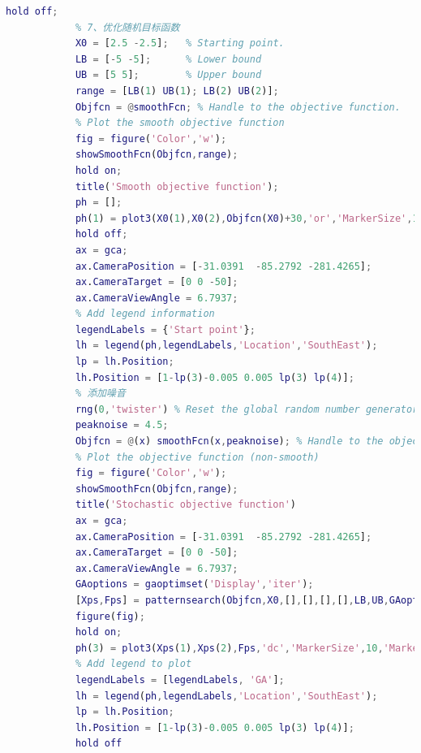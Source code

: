 \begin{lstlisting}[language = Matlab]
            hold off;
            % 7、优化随机目标函数
            X0 = [2.5 -2.5];   % Starting point.
            LB = [-5 -5];      % Lower bound
            UB = [5 5];        % Upper bound
            range = [LB(1) UB(1); LB(2) UB(2)];
            Objfcn = @smoothFcn; % Handle to the objective function.
            % Plot the smooth objective function
            fig = figure('Color','w');
            showSmoothFcn(Objfcn,range);
            hold on;
            title('Smooth objective function');
            ph = [];
            ph(1) = plot3(X0(1),X0(2),Objfcn(X0)+30,'or','MarkerSize',10,'MarkerFaceColor','r');
            hold off;
            ax = gca;
            ax.CameraPosition = [-31.0391  -85.2792 -281.4265];
            ax.CameraTarget = [0 0 -50];
            ax.CameraViewAngle = 6.7937;
            % Add legend information
            legendLabels = {'Start point'};
            lh = legend(ph,legendLabels,'Location','SouthEast');
            lp = lh.Position;
            lh.Position = [1-lp(3)-0.005 0.005 lp(3) lp(4)];
            % 添加噪音
            rng(0,'twister') % Reset the global random number generator
            peaknoise = 4.5;
            Objfcn = @(x) smoothFcn(x,peaknoise); % Handle to the objective function.
            % Plot the objective function (non-smooth)
            fig = figure('Color','w');
            showSmoothFcn(Objfcn,range);
            title('Stochastic objective function')
            ax = gca;
            ax.CameraPosition = [-31.0391  -85.2792 -281.4265];
            ax.CameraTarget = [0 0 -50];
            ax.CameraViewAngle = 6.7937;
            GAoptions = gaoptimset('Display','iter');
            [Xps,Fps] = patternsearch(Objfcn,X0,[],[],[],[],LB,UB,GAoptions)
            figure(fig);
            hold on;
            ph(3) = plot3(Xps(1),Xps(2),Fps,'dc','MarkerSize',10,'MarkerFaceColor','c');
            % Add legend to plot
            legendLabels = [legendLabels, 'GA'];
            lh = legend(ph,legendLabels,'Location','SouthEast');
            lp = lh.Position;
            lh.Position = [1-lp(3)-0.005 0.005 lp(3) lp(4)];
            hold off
            \end{lstlisting}
